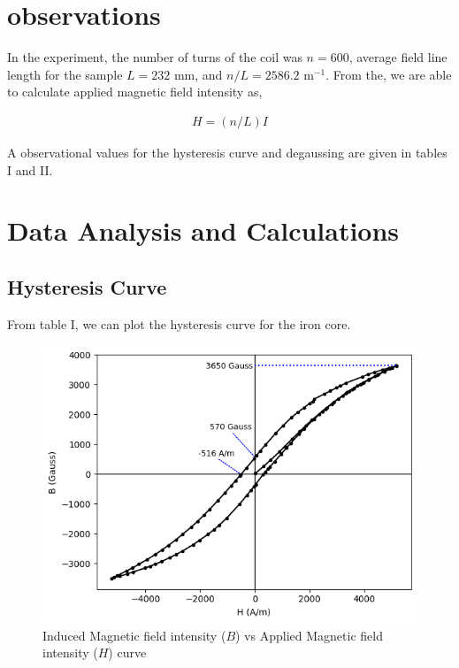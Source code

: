 \section{observations}
In the experiment, the number of turns of the coil was $n=600$, average field line length for the sample $L=232$ mm, and $n/L= 2586.2$ m$^{-1}$. From the, we are able to calculate applied magnetic field intensity as,

\begin{align}
    H=(n/L)I
\end{align}

A observational values for the hysteresis curve and degaussing are given in tables I and II.



\section{Data Analysis and Calculations}

\subsection*{Hysteresis Curve}

From table I, we can plot the hysteresis curve for the iron core.

\begin{figure}[H]
    \centering
    \includegraphics[width=1\columnwidth]{images/g1.png}
    \caption{Induced Magnetic field intensity ($B$) vs Applied Magnetic field intensity ($H$) curve}
    \label{graph:1}
\end{figure}


